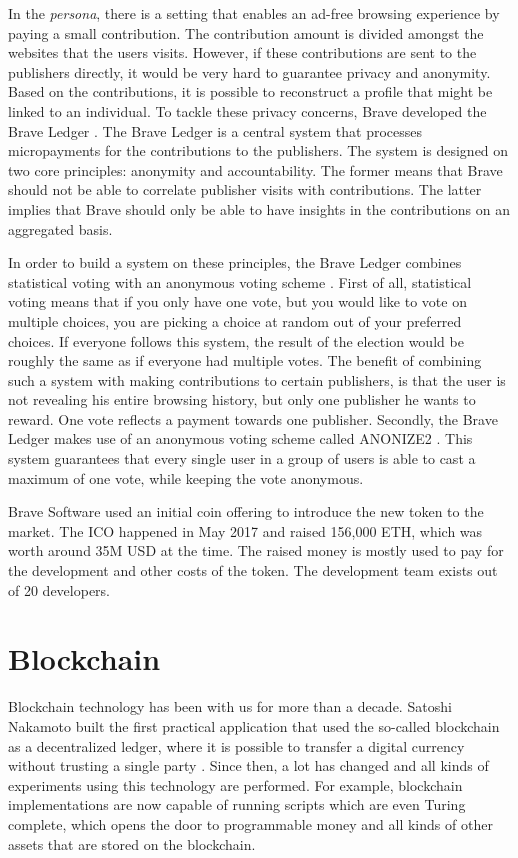 In the \textit{persona}, there is a setting that enables an ad-free browsing experience by paying a small contribution. The contribution amount is divided amongst the websites that the users visits. However, if these contributions are sent to the publishers directly, it would be very hard to guarantee privacy and anonymity. Based on the contributions, it is possible to reconstruct a profile that might be linked to an individual. To tackle these privacy concerns, Brave developed the Brave Ledger \cite{bat-ledger}. The Brave Ledger is a central system that processes micropayments for the contributions to the publishers. The system is designed on two core principles: anonymity and accountability. The former means that Brave should not be able to correlate publisher visits with contributions. The latter implies that Brave should only be able to have insights in the contributions on an aggregated basis.

In order to build a system on these principles, the Brave Ledger combines statistical voting with an anonymous voting scheme \cite{bat-ledger}. First of all, statistical voting means that if you only have one vote, but you would like to vote on multiple choices, you are picking a choice at random out of your preferred choices. If everyone follows this system, the result of the election would be roughly the same as if everyone had multiple votes. The benefit of combining such a system with making contributions to certain publishers, is that the user is not revealing his entire browsing history, but only one publisher he wants to reward. One vote reflects a payment towards one publisher. Secondly, the Brave Ledger makes use of an anonymous voting scheme called ANONIZE2 \cite{hohenberger2014anonize}. This system guarantees that every single user in a group of users is able to cast a maximum of one vote, while keeping the vote anonymous.

Brave Software used an initial coin offering to introduce the new token to the market. The ICO happened in May 2017 and raised 156,000 ETH, which was worth around 35M USD at the time. The raised money is mostly used to pay for the development and other costs of the token. The development team exists out of 20 developers.

\section{Blockchain}

Blockchain technology has been with us for more than a decade. Satoshi Nakamoto built the first practical application that used the so-called blockchain as a decentralized ledger, where it is possible to transfer a digital currency without trusting a single party \cite{nakamoto2019bitcoin}. Since then, a lot has changed and all kinds of experiments using this technology are performed. For example, blockchain implementations are now capable of running scripts which are even Turing complete, which opens the door to programmable money \cite{wood2014ethereum} and all kinds of other assets that are stored on the blockchain.

